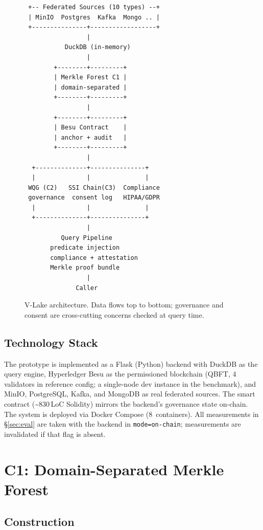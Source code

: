 \documentclass[10pt,twocolumn]{article}
\begin{document}
\begin{figure}[t]
\centering
\scriptsize
\begin{verbatim}
 +-- Federated Sources (10 types) --+
 | MinIO  Postgres  Kafka  Mongo .. |
 +---------------+------------------+
                 |
           DuckDB (in-memory)
                 |
        +--------+---------+
        | Merkle Forest C1 |
        | domain-separated |
        +--------+---------+
                 |
        +--------+---------+
        | Besu Contract    |
        | anchor + audit   |
        +--------+---------+
                 |
  +--------------+---------------+
  |              |               |
 WQG (C2)   SSI Chain(C3)  Compliance
 governance  consent log   HIPAA/GDPR
  |              |               |
  +--------------+---------------+
                 |
          Query Pipeline
       predicate injection
       compliance + attestation
       Merkle proof bundle
                 |
              Caller
\end{verbatim}
\caption{V-Lake architecture. Data flows top to bottom; governance
and consent are cross-cutting concerns checked at query time.}
\label{fig:arch}
\end{figure}

\subsection{Technology Stack}

The prototype is implemented as a Flask (Python) backend with
DuckDB as the query engine, Hyperledger Besu as the permissioned
blockchain (QBFT, 4 validators in reference config; a single-node
dev instance in the benchmark), and MinIO, PostgreSQL, Kafka, and
MongoDB as real federated sources. The smart contract
(\textasciitilde830\,LoC Solidity) mirrors the backend's governance
state on-chain. The system is deployed via Docker Compose
(8~containers). All measurements in \S\ref{sec:eval} are taken
with the backend in \texttt{mode=on-chain}; measurements are
invalidated if that flag is absent.


\section{C1: Domain-Separated Merkle Forest}
\label{sec:merkle}

\subsection{Construction}
\end{document}
